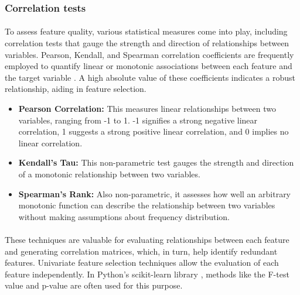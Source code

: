         \subsubsection{Correlation tests}\label{seq:background:correlation_tests}
            \paragraph{}To assess feature quality, various statistical measures come into play, including correlation tests that gauge the strength and direction of relationships between variables. Pearson, Kendall, and Spearman correlation coefficients are frequently employed to quantify linear or monotonic associations between each feature and the target variable \cite{boddy_statistical_2009}. A high absolute value of these coefficients indicates a robust relationship, aiding in feature selection.

            \begin{itemize}
                \item \textbf{Pearson Correlation:} This measures linear relationships between two variables, ranging from -1 to 1. -1 signifies a strong negative linear correlation, 1 suggests a strong positive linear correlation, and 0 implies no linear correlation.

                \item \textbf{Kendall’s Tau:} This non-parametric test gauges the strength and direction of a monotonic relationship between two variables.

                \item \textbf{Spearman’s Rank:} Also non-parametric, it assesses how well an arbitrary monotonic function can describe the relationship between two variables without making assumptions about frequency distribution.
            \end{itemize}
        
            \paragraph{}These techniques are valuable for evaluating relationships between each feature and generating correlation matrices, which, in turn, help identify redundant features. Univariate feature selection techniques allow the evaluation of each feature independently. In Python's scikit-learn library \cite{pedregosa_scikit-learn_2011}, methods like the F-test value and p-value are often used for this purpose.

